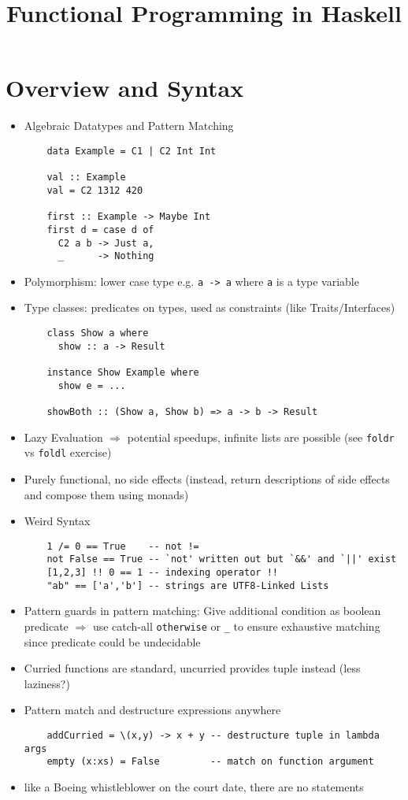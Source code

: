 \documentclass[oneside, a4paper]{article}
\author{ }
\title{Functional Programming in Haskell}
\begin{document}
\maketitle

\section{Overview and Syntax}
\begin{itemize}
  \item Algebraic Datatypes and Pattern Matching
  \begin{verbatim}
    data Example = C1 | C2 Int Int
    
    val :: Example
    val = C2 1312 420
  
    first :: Example -> Maybe Int
    first d = case d of 
      C2 a b -> Just a,
      _      -> Nothing
  \end{verbatim}
  \item Polymorphism: lower case type e.g. \texttt{a -> a} where \texttt{a} is a type variable
  \item Type classes: predicates on types, used as constraints (like Traits/Interfaces) \begin{verbatim}
    class Show a where 
      show :: a -> Result

    instance Show Example where 
      show e = ...

    showBoth :: (Show a, Show b) => a -> b -> Result
  \end{verbatim}
  \item Lazy Evaluation $\Longrightarrow$ potential speedups,  infinite lists are possible (see \texttt{foldr} vs \texttt{foldl} exercise)
  \item Purely functional, no side effects (instead, return descriptions of side effects and compose them using monads)
  \item Weird Syntax \begin{verbatim}
    1 /= 0 == True    -- not !=
    not False == True -- `not' written out but `&&' and `||' exist
    [1,2,3] !! 0 == 1 -- indexing operator !!
    "ab" == ['a','b'] -- strings are UTF8-Linked Lists
  \end{verbatim}
  \item Pattern guards in pattern matching: Give additional condition as boolean predicate $\Longrightarrow$ use catch-all \texttt{otherwise} or \texttt{\_} to ensure exhaustive matching since predicate could be undecidable
  \item Curried functions are standard, uncurried provides tuple instead (less laziness?)
  \item Pattern match and destructure expressions anywhere
  \begin{verbatim}
    addCurried = \(x,y) -> x + y -- destructure tuple in lambda args
    empty (x:xs) = False         -- match on function argument
  \end{verbatim}
  \item like a Boeing whistleblower on the court date, there are no statements
\end{itemize}
\end{document}
